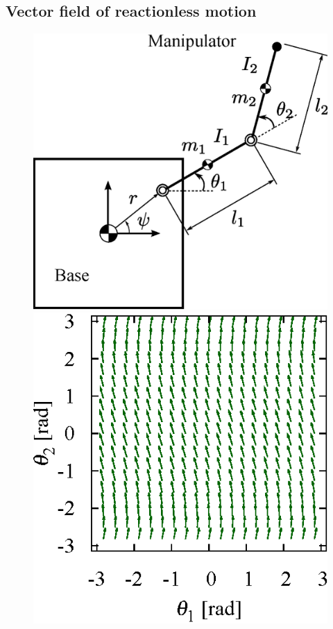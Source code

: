 \subsection{Vector field of reactionless motion}
\label{sec:ANALYSIS_FIXED}
%
\begin{figure}[t]
  \centering
  \begin{minipage}[t]{0.36\linewidth}
    \centering
    \includegraphics[width=1.0\linewidth]{fig/chapter3/planar/FF2RModel.eps}
  \end{minipage}
  \hspace{4mm}
  \begin{minipage}[t]{0.30\linewidth}
    \centering
    \includegraphics[width=1.0\linewidth]{fig/chapter3/planar/vectorField.eps}

\end{minipage}
\end{figure}
